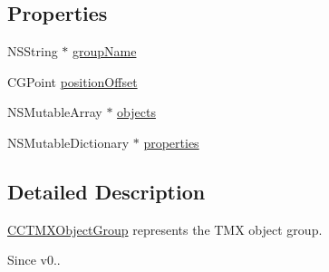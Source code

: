 \subsection*{Properties}
\begin{DoxyCompactItemize}
\item 
N\-S\-String $\ast$ \hyperlink{interface_c_c_t_m_x_object_group_a5d0f01f95c03ceeb4691a103974b6144}{group\-Name}
\item 
C\-G\-Point \hyperlink{interface_c_c_t_m_x_object_group_ae945ec4408f80933f0a0ab956fb28a6b}{position\-Offset}
\item 
N\-S\-Mutable\-Array $\ast$ \hyperlink{interface_c_c_t_m_x_object_group_aac3da52ce56ed92d32b44500f5bd8f61}{objects}
\item 
N\-S\-Mutable\-Dictionary $\ast$ \hyperlink{interface_c_c_t_m_x_object_group_a04a65b75f65112e6bcbd298d875a8ad1}{properties}
\end{DoxyCompactItemize}


\subsection{Detailed Description}
\hyperlink{interface_c_c_t_m_x_object_group}{C\-C\-T\-M\-X\-Object\-Group} represents the T\-M\-X object group. \begin{DoxySince}{Since}
v0.. 
\end{DoxySince}


